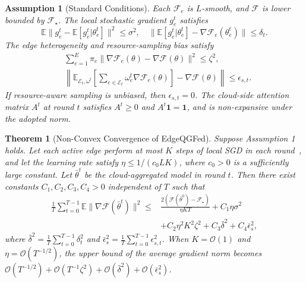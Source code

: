 ﻿\documentclass[10pt, conference, letterpaper]{ IEEEtran}
\newtheorem{assumption}{Assumption}
\newtheorem{theorem}{Theorem}
\begin{document}
\begin{assumption}[Standard Conditions]
Each $\mathcal{F}_e$ is $L$-smooth, and $\mathcal{F}$ is lower bounded by $\mathcal{F}_\star$. The local stochastic gradient $g_e^t$ satisfies
\begin{equation}
    \mathbb{E}\|g_e^t-\mathbb{E}[g_e^t|\theta_e^t]\|^2\le\sigma^2,\quad
    \|\mathbb{E}[g_e^t|\theta_e^t]-\nabla\mathcal{F}_e(\theta_e^t)\|\le\delta_t .
\end{equation}
The edge heterogeneity and resource-sampling bias satisfy
\begin{align}
    &\sum_{e=1}^{E}\pi_e
    \|\nabla\mathcal{F}_e(\theta)-\nabla\mathcal{F}(\theta)\|^2
    \le \zeta^2,
    \label{eq:heterogeneity_bound}\\
    &
    \left\|\mathbb{E}_{\mathcal{E}_t,\omega^t}\!\left[
    \sum_{e\in\mathcal{E}_t}
    \omega_e^t\nabla\mathcal{F}_e(\theta)\right]
    -\nabla\mathcal{F}(\theta)\right\|
    \le \epsilon_{s,t}.
    \label{eq:sampling_bias_bound}
\end{align}
If resource-aware sampling is unbiased, then $\epsilon_{s,t}=0$. The cloud-side attention matrix $A^t$ at round $t$ satisfies $A^t\ge0$ and $A^t\mathbf{1}=\mathbf{1}$, and is non-expansive under the adopted norm.
\end{assumption}

\begin{theorem}[Non-Convex Convergence of EdgeQGFed]
Suppose Assumption 1 holds. Let each active edge perform at most $K$ steps of local SGD in each round~\cite{stich2018local}, and let the learning rate satisfy $\eta\le 1/(c_0LK)$, where $c_0>0$ is a sufficiently large constant. Let $\bar{\theta}^t$ be the cloud-aggregated model in round $t$. Then there exist constants $C_1,C_2,C_3,C_4>0$ independent of $T$ such that
\begin{align}
    \frac{1}{T}\sum_{t=0}^{T-1}
    \mathbb{E}\|\nabla\mathcal{F}(\bar{\theta}^t)\|^2
    \le&
    \frac{2(\mathcal{F}(\bar{\theta}^0)-\mathcal{F}_\star)}{\eta KT}
    +C_1\eta\sigma^2 \nonumber\\
    &+C_2\eta^2K^2\zeta^2
    +C_3\bar{\delta}^2
    +C_4\bar{\epsilon}_s^2 ,
    \label{eq:convergence_bound}
\end{align}
where
$\bar{\delta}^2=\frac{1}{T}\sum_{t=0}^{T-1}\delta_t^2$ and
$\bar{\epsilon}_s^2=\frac{1}{T}\sum_{t=0}^{T-1}\epsilon_{s,t}^2$.
When $K=\mathcal{O}(1)$ and $\eta=\mathcal{O}(T^{-1/2})$, the upper bound of the average gradient norm becomes
$\mathcal{O}(T^{-1/2})+\mathcal{O}(T^{-1}\zeta^2)+
\mathcal{O}(\bar{\delta}^2)+\mathcal{O}(\bar{\epsilon}_s^2)$.
\end{theorem}
\end{document}
